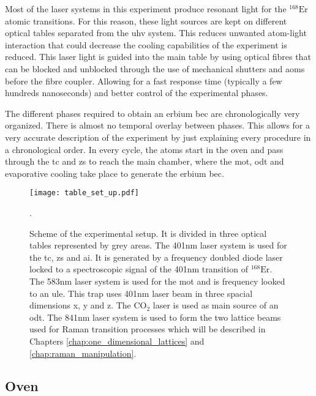Most of the laser systems in this experiment produce resonant light for the $^{\text{168}}\text{Er}$ atomic transitions. For this reason, these light sources are kept on different optical tables separated from the \ac{uhv} system. This reduces unwanted atom-light interaction that could decrease the cooling capabilities of the experiment is reduced. This laser light is guided into the main table by using optical fibres that can be blocked and unblocked through the use of mechanical shutters and \acp{aom} before the fibre coupler. Allowing for a fast response time (typically a few hundreds nanoseconds) and better control of the experimental phases.

The different phases required to obtain an erbium \ac{bec} are chronologically very organized. There is almost no temporal overlay between phases. This allows for a very accurate description of the experiment by just explaining every procedure in a chronological order. In every cycle, the atoms start in the oven and pass through the \ac{tc} and \acf{zs} to reach the main chamber, where the \ac{mot}, \ac{odt} and evaporative cooling take place to generate the erbium \acl*{bec}.

\begin{figure}[!hbtp]\centering
	\texttt{[image: table\_set\_up.pdf]}
	\caption[Scheme of the experimental setup]{Scheme of the experimental setup. It is divided in three optical tables represented by grey areas. The 401nm laser system is used for the \acf{tc}, \acf{zs} and \acf{ai}. It is generated by a frequency doubled diode laser locked to a spectroscopic signal of the 401nm transition of $^{\text{168}}\text{Er}$. The 583nm laser system is used for the \acf{mot} and is frequency looked to an \acf{ule}. This trap uses 401nm laser beam in three spacial dimensions x, y and z. The $\text{CO}_{2}$ laser is used as main source of an \acf{odt}. The 841nm laser system is used to form the two lattice beams used for Raman transition processes which will be described in Chapters \ref{chap:one_dimensional_lattices} and \ref{chap:raman_manipulation}.}\label{fig:table_set_up}. 
\end{figure}

\subsection{Oven}\label{subsec:oven}

